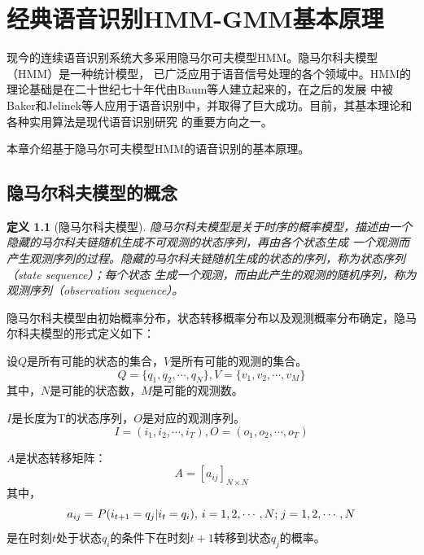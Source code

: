 ﻿%

\chapter{经典语音识别HMM-GMM基本原理}\label{intro_hmm}

现今的连续语音识别系统大多采用隐马尔可夫模型HMM。隐马尔科夫模型（HMM）是一种统计模型，
已广泛应用于语音信号处理的各个领域中。HMM的理论基础是在二十世纪七十年代由Baum等人建立起来的，在之后的发展
中被Baker和Jelinek等人应用于语音识别中，并取得了巨大成功。目前，其基本理论和各种实用算法是现代语音识别研究
的重要方向之一。

本章介绍基于隐马尔可夫模型HMM的语音识别的基本原理。

\newtheorem{definition}{\hspace{2em}\textbf{定义}}[section]
%
\section{隐马尔科夫模型的概念}

    \begin{definition}[隐马尔科夫模型]
    隐马尔科夫模型是关于时序的概率模型，描述由一个隐藏的马尔科夫链随机生成不可观测的状态序列，再由各个状态生成
    一个观测而产生观测序列的过程。隐藏的马尔科夫链随机生成的状态的序列，称为状态序列（state sequence）；每个状态
    生成一个观测，而由此产生的观测的随机序列，称为观测序列（observation sequence）。
    \end{definition}


    隐马尔科夫模型由初始概率分布，状态转移概率分布以及观测概率分布确定，隐马尔科夫模型的形式定义如下：

    设$Q$是所有可能的状态的集合，$V$是所有可能的观测的集合。
    \[Q = \{ {q_1},{q_2},\cdots,{q_N}\} , V = \{ {v_1},{v_2},\cdots,{v_M}\} \]
    其中，$N$是可能的状态数，$M$是可能的观测数。

    $I$是长度为T的状态序列，$O$是对应的观测序列。
    \[I = ({i_1},{i_2},\cdots,{i_T}), O = ({o_1},{o_2},\cdots,{o_T})\]

    $A$是状态转移矩阵：
    \begin{equation}
    A = {\left[ {{a_{ij}}} \right]_{N \times N}}
    \end{equation}
    其中，
    \begin{equation}
    {a_{ij}} = {\kern 1pt} P({i_{t + 1}} = {q_j}|{i_t} = {q_i}),{\kern 1pt} {\kern 1pt} i = 1,2, \cdots ,N;{\kern 1pt} j = 1,2, \cdots ,N
    \end{equation}
    是在时刻$t$处于状态$q_i$的条件下在时刻$t+1$转移到状态$q_j$的概率。

